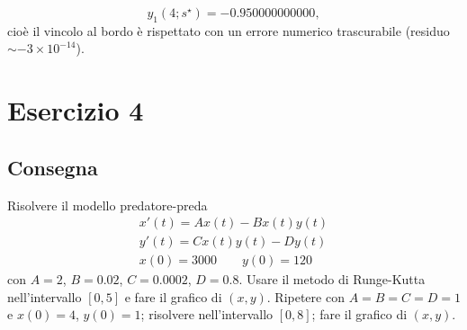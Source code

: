\documentclass[11pt]{article}
\begin{document}
\[
y_1(4; s^\star) = -0.950000000000,
\]
cioè il vincolo al bordo è rispettato con un errore numerico trascurabile (residuo \(\sim -3 \times 10^{-14}\)).
\section{Esercizio 4}
\subsection{Consegna}
Risolvere il modello predatore-preda
\begin{align}
	x'(t)=Ax(t)-Bx(t)y(t)\\
	y'(t)=Cx(t)y(t)-Dy(t)\\
	x(0)=3000 \qquad y(0)=120
\end{align}
con $A = 2$, $B = 0.02$, $C = 0.0002$, $D = 0.8$. Usare il metodo di Runge-Kutta nell’intervallo $[0, 5]$ e fare il grafico di $(x, y)$. Ripetere con $A = B = C = D = 1$ e $x(0) = 4$, $y(0) = 1$; risolvere nell’intervallo $[0,8]$; fare il grafico di $(x, y)$.
\end{document}
